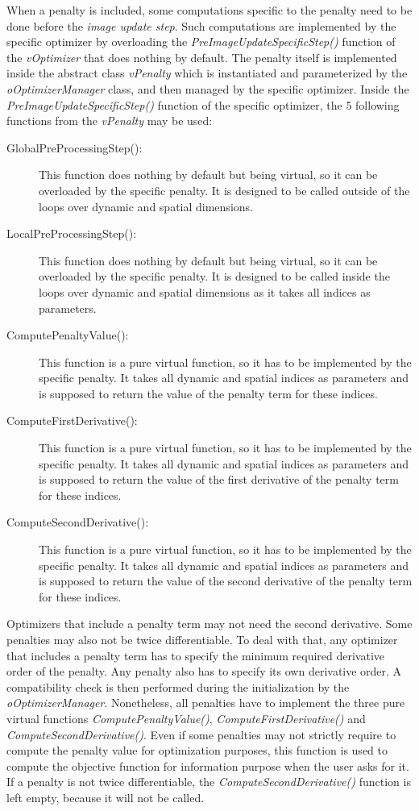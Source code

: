 \documentclass[a4paper, 11pt]{article}
\begin{document}
When a penalty is included, some computations specific to the penalty need to be done before the \textit{image update step}.
Such computations are implemented by the specific optimizer by overloading the \textit{PreImageUpdateSpecificStep()} function of the \textit{vOptimizer} that does nothing by default.
The penalty itself is implemented inside the abstract class \textit{vPenalty} which is instantiated and parameterized by the \textit{oOptimizerManager} class, and then managed by the specific optimizer.
Inside the \textit{PreImageUpdateSpecificStep()} function of the specific optimizer, the 5 following functions from the \textit{vPenalty} may be used:
\begin{description}
  \item[GlobalPreProcessingStep():]
This function does nothing by default but being virtual, so it can be overloaded by the specific penalty.
It is designed to be called outside of the loops over dynamic and spatial dimensions.
  \item[LocalPreProcessingStep():]
This function does nothing by default but being virtual, so it can be overloaded by the specific penalty.
It is designed to be called inside the loops over dynamic and spatial dimensions as it takes all indices as parameters.
  \item[ComputePenaltyValue():]
This function is a pure virtual function, so it has to be implemented by the specific penalty.
It takes all dynamic and spatial indices as parameters and is supposed to return the value of the penalty term for these indices.
  \item[ComputeFirstDerivative():]
This function is a pure virtual function, so it has to be implemented by the specific penalty.
It takes all dynamic and spatial indices as parameters and is supposed to return the value of the first derivative of the penalty term for these indices.
  \item[ComputeSecondDerivative():]
This function is a pure virtual function, so it has to be implemented by the specific penalty.
It takes all dynamic and spatial indices as parameters and is supposed to return the value of the second derivative of the penalty term for these indices.
\end{description}

\bigskip

Optimizers that include a penalty term may not need the second derivative.
Some penalties may also not be twice differentiable.
To deal with that, any optimizer that includes a penalty term has to specify the minimum required derivative order of the penalty.
Any penalty also has to specify its own derivative order.
A compatibility check is then performed during the initialization by the \textit{oOptimizerManager}.
Nonetheless, all penalties have to implement the three pure virtual functions \textit{ComputePenaltyValue()}, \textit{ComputeFirstDerivative()} and \textit{ComputeSecondDerivative()}.
Even if some penalties may not strictly require to compute the penalty value for optimization purposes, this function is used to compute the objective function for information purpose when the user asks for it.
If a penalty is not twice differentiable, the \textit{ComputeSecondDerivative()} function is left empty, because it will not be called.
\end{document}
